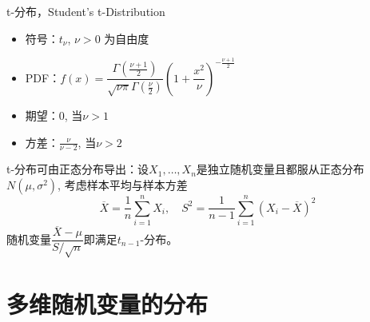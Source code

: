 
\begin{frame}

\begin{block}{t-分布，Student's t-Distribution}
\begin{itemize}
\item 符号：$t_{\nu}$, \; $\nu > 0$ 为自由度
\item PDF：$f(x) = \dfrac{\Gamma(\frac{\nu+1}{2})}{\sqrt{\nu\pi}\Gamma(\frac{\nu}{2})} \left( 1 + \dfrac{x^2}{\nu} \right)^{-\frac{\nu+1}{2}}$
\item 期望：$0$, 当$\nu > 1$
\item 方差：$\frac{\nu}{\nu-2}$, 当$\nu > 2$
\end{itemize}
\end{block}

\pause

t-分布可由正态分布导出：设$X_1,\ldots,X_n$是独立随机变量且都服从正态分布$N(\mu, \sigma^2)$, 考虑样本平均与样本方差
$$\overline{X} = \dfrac{1}{n}\sum\limits_{i=1}^n X_i, \quad S^2 = \dfrac{1}{n-1}\sum\limits_{i=1}^n (X_i-\overline{X})^2$$
随机变量$\dfrac{\overline{X} - \mu}{S/\sqrt{n}}$即满足$t_{n-1}$-分布。

\end{frame}








\section{多维随机变量的分布}


